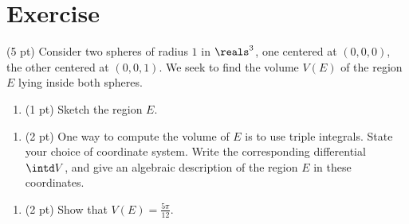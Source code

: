 \section{Exercise}

(5 pt) Consider two spheres of radius $1$ in $\reals^{3}$, one centered at $(0,0,0)$, the other centered at $(0,0,1)$. We seek to find the volume $V(E)$ of the region $E$ lying inside both spheres.
\begin{enumerate}[label=(\alph*)]
\item (1 pt) Sketch the region $E$.
\end{enumerate}

\spaceSolution{1.5in}{%
}%



\begin{enumerate}[resume,label=(\alph*)]
\item (2 pt) One way to compute the volume of $E$ is to use triple integrals. State your choice of coordinate system. Write the corresponding differential $\intd V$, and give an algebraic description of the region $E$ in these coordinates. 
\end{enumerate}

\spaceSolution{1in}{%
}%



\begin{enumerate}[resume,label=(\alph*)]
\item (2 pt) Show that $V(E) = \frac{5 \pi}{12}$. 
\end{enumerate}

\spaceSolution{4in}{%
}%